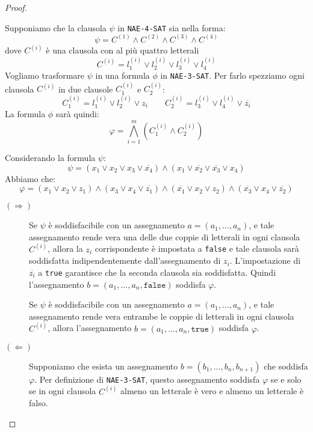 \begin{proof}
\begin{itemize}
    Supponiamo che la clausola $\psi$ in \texttt{NAE-4-SAT} sia nella forma:
    \[
        \psi = C^{(1)} \land C^{(2)} \land C^{(3)} \land C^{(4)}
    \]
    dove $C^{(i)}$ è una clausola con al più quattro letterali
    \[
        C^{(i)} = l_1^{(i)} \lor l_2^{(i)} \lor l_3^{(i)} \lor l_4^{(i)}
    \]
    Vogliamo trasformare $\psi$ in una formula $\phi$ in \texttt{NAE-3-SAT}.
    Per farlo spezziamo ogni clausola $C^{(i)}$ in due clausole $C_1^{(i)}$ e
    $C_2^{(i)}$:
    \[
        C_1^{(i)} = l_1^{(i)} \lor l_2^{(i)} \lor z_i \qquad
        C_2^{(i)} = l_3^{(i)} \lor l_4^{(i)} \lor \overline{z_i}
    \]
    La formula $\phi$ sarà quindi:
    \[
        \varphi = \bigwedge_{i=1}^{m} (C_1^{(i)} \land C_2^{(i)})
    \]

    Considerando la formula $\psi$:
    \[
        \psi = (x_1 \lor x_2 \lor x_3 \lor \overline{x_4}) \land
        (x_1 \lor \overline{x_2} \lor \overline{x_3} \lor x_4)
    \]
    Abbiamo che:
    \[
        \varphi = (x_1 \lor x_2 \lor z_1) \land (x_3 \lor x_4 \lor \overline{z_1}) 
        \land (\overline{x_1} \lor x_2 \lor z_2) \land (\overline{x_3} \lor 
        x_4 \lor \overline{z_2})
    \]
    \begin{description}
        \item[$(\Rightarrow)$] Se $\psi$ è soddisfacibile con un assegnamento
        $a = (a_1, \dots, a_n)$, e tale assegnamento rende vera una delle due
        coppie di letterali in ogni clausola $C^{(i)}$, allora la $z_i$ corrispondente
        è impostata a \texttt{false} e tale clausola sarà soddisfatta indipendentemente
        dall'assegnamento di $z_i$. L'impostazione di $\overline{z_i}$ a \texttt{true} 
        garantisce che la seconda clausola sia soddisfatta. Quindi l'assegnamento
        $b = (a_1, \dots, a_n, \texttt{false})$ soddisfa $\varphi$.

        Se $\psi$ è soddisfacibile con un assegnamento $a = (a_1, \dots, a_n)$, e tale
        assegnamento rende vera entrambe le coppie di letterali in ogni clausola $C^{(i)}$,
        allora l'assegnamento $b = (a_1, \dots, a_n, \texttt{true})$ soddisfa $\varphi$.
        \item[$(\Leftarrow)$] Supponiamo che esista un assegnamento \( b = (b_1, \dots, b_n, b_{n+1}) \) che soddisfa \( \varphi \). Per definizione di \texttt{NAE-3-SAT}, questo assegnamento soddisfa \( \varphi \) se e solo se in ogni clausola \( C^{(i)} \) almeno un letterale è vero e almeno un letterale è falso.


\end{description}
\end{itemize}
\end{proof}
